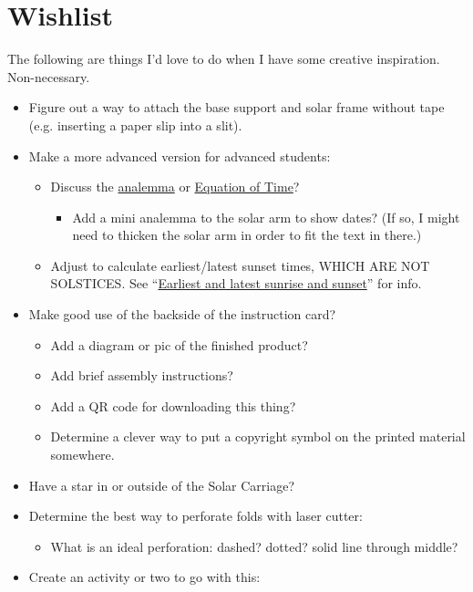 \documentclass[tikz]{article}
\begin{document}
	\section*{Wishlist}
	The following are things I'd love to do when I have some creative inspiration. Non-necessary. 
	\begin{itemize}
		\item Figure out a way to attach the base support and solar frame without tape (e.g. inserting a paper slip into a slit). 
		\item Make a more advanced version for advanced students:
		\begin{itemize}
			\item Discuss the \href{https://en.wikipedia.org/wiki/Analemma}{analemma} or \href{https://en.wikipedia.org/wiki/Equation_of_time}{Equation of Time}?
			\begin{itemize}
				\item Add a mini analemma to the solar arm to show dates? (If so, I might need to thicken the solar arm in order to fit the text in there.)
			\end{itemize}
			\item Adjust to calculate earliest/latest sunset times, WHICH ARE NOT SOLSTICES. See ``\href{https://en.wikipedia.org/wiki/Analemma#Earliest_and_latest_sunrise_and_sunset}{Earliest and latest sunrise and sunset}'' for info. 
		\end{itemize}
		\item Make good use of the backside of the instruction card? 
		\begin{itemize}
			\item Add a diagram or pic of the finished product?
			\item Add brief assembly instructions?
			\item Add a QR code for downloading this thing? 
			\item Determine a clever way to put a copyright symbol on the printed material somewhere. 
		\end{itemize}
		\item Have a star in or outside of the Solar Carriage?
		\item Determine the best way to perforate folds with laser cutter: 
		\begin{itemize}
			\item What is an ideal perforation: dashed? dotted? solid line through middle?
		\end{itemize}
		\item Create an activity or two to go with this: 

\end{itemize}
\end{document}
